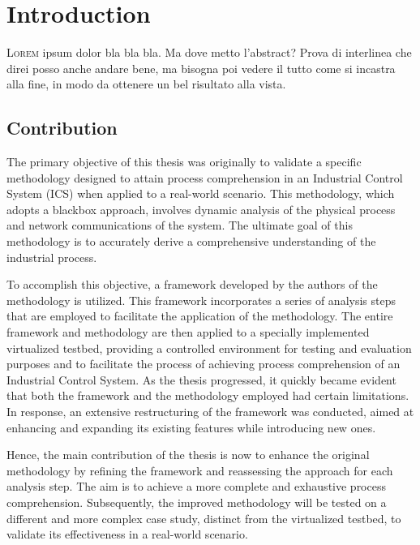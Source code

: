 \chapter{Introduction}
\label{intro}
\linenumbers

\lettrine[lines=2]{L}{orem} ipsum dolor bla bla bla. Ma dove metto l'abstract? Prova di interlinea che direi posso anche andare bene, ma bisogna poi vedere il tutto come si incastra alla fine, in modo da ottenere un bel risultato alla vista. 

\section{Contribution}
\label{sec:1_contribution}

The primary objective of this thesis was originally to validate a specific methodology designed to attain process comprehension in an Industrial Control System (ICS) when applied to a real-world scenario. This methodology, which adopts a blackbox approach, involves dynamic analysis of the physical process and network communications of the system. The ultimate goal of this methodology is to accurately derive a comprehensive understanding of the industrial process.

\bigskip
To accomplish this objective, a framework developed by the authors of the methodology is utilized. This framework incorporates a series of analysis steps that are employed to facilitate the application of the methodology. The entire framework and methodology are then applied to a specially implemented virtualized testbed, providing a controlled environment for testing and evaluation purposes and to facilitate the process of achieving process comprehension of an Industrial Control System.\newline
As the thesis progressed, it quickly became evident that both the framework and the methodology employed had certain limitations. In response, an extensive restructuring of the framework was conducted, aimed at enhancing and expanding its existing features while introducing new ones.

\bigskip
Hence, the main contribution of the thesis is now to enhance the original methodology by refining the framework and reassessing the approach for each analysis step. The aim is to achieve a more complete and exhaustive process comprehension. Subsequently, the improved methodology will be tested on a different and more complex case study, distinct from the virtualized testbed, to validate its effectiveness in a real-world scenario.

